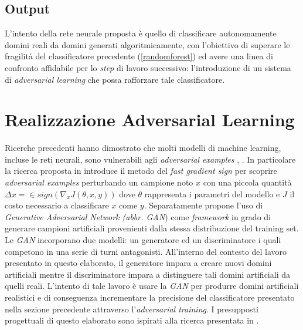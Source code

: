 \subsection{Output}
\label{classificatorennoutput}
L'intento della rete neurale proposta è quello di classificare autonomamente domini reali da domini generati algoritmicamente, con l'obiettivo di superare le fragilità del classificatore precedente (\ref{randomforest}) ed avere una linea di confronto affidabile per lo \textit{step} di lavoro successivo: l'introduzione di un sistema di \textit{adversarial learning} che possa rafforzare tale classificatore. 


\section{Realizzazione Adversarial Learning}
\label{adv}
Ricerche precedenti hanno dimostrato che molti modelli di machine learning, incluse le reti neurali, sono vulnerabili agli \textit{adversarial examples} \cite{1312.6199},  \cite{1412.6572}. In particolare la ricerca proposta in \cite{1412.6572} introduce il metodo del \textit{fast gradient sign} per scoprire \textit{adversarial examples} perturbando un campione noto $x$ con una piccola quantità $\Delta x =  \in sign(\nabla_x J(\theta,x,y))$ dove $\theta$ rappresenta i parametri del modello e $J$ il costo necessario a classificare $x$ come $y$.
Separatamente \cite{1406.2661} propone l'uso di \textit{Generative Adversarial Network (abbr. GAN})  come \textit{framework} in grado di generare campioni artificiali provenienti dalla stessa distribuzione del training set.
Le \textit{GAN} incorporano due modelli: un generatore ed un discriminatore i quali competono in una serie di turni antagonisti. All'interno del contesto del lavoro presentato in questo elaborato, il generatore impara a creare nuovi domini artificiali mentre il discriminatore impara a distinguere tali domini artificiali da quelli reali. L'intento di tale lavoro è usare la \textit{GAN} per produrre domini artificiali realistici e di conseguenza incrementare la precisione del classificatore presentato nella sezione precedente attraverso l'\textit{adversarial training}. I presupposti progettuali di questo elaborato sono ispirati alla ricerca presentata in \cite{deepdga}.

